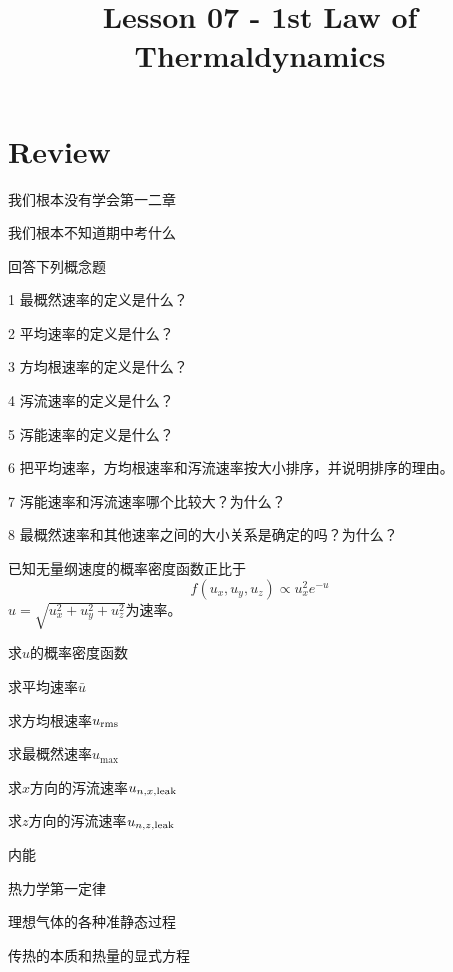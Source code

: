 \documentclass[CJK]{beamer}
\title{Lesson 07 - 1st Law of Thermaldynamics}
\author{}
\date{}
\begin{document}


\section{Review}

\begin{frame}
\bch
\bitem
\item{我们根本没有学会第一二章}
\item{我们根本不知道期中考什么}
\eitem
\ech
\end{frame}

\begin{frame}
\bch
回答下列概念题
\bitem
\item[1]{最概然速率的定义是什么？}
\item[2]{平均速率的定义是什么？}
\item[3]{方均根速率的定义是什么？}
\item[4]{泻流速率的定义是什么？}
\item[5]{泻能速率的定义是什么？}
\item[6]{把平均速率，方均根速率和泻流速率按大小排序，并说明排序的理由。}
\item[7]{泻能速率和泻流速率哪个比较大？为什么？}
\item[8]{最概然速率和其他速率之间的大小关系是确定的吗？为什么？}
\eitem

\ech
\end{frame}

\begin{frame}
\bch
{ 已知无量纲速度的概率密度函数正比于
$$f(u_x,u_y,u_z) \propto u_x^2 e^{-u}$$
$u = \sqrt{u_x^2+u_y^2+u_z^2}$为速率。
\bitem
\item{求$u$的概率密度函数}
\item{求平均速率$\bar{u}$}
\item{求方均根速率$u_{\rm rms}$}
\item{求最概然速率$u_{\max}$}
\item{求$x$方向的泻流速率$u_{n, x, \rm leak}$}
\item{求$z$方向的泻流速率$u_{n, z, \rm leak}$}
\eitem
}
\ech
\end{frame}


\begin{frame}
\bch
\bitem
\item{内能}
\item{热力学第一定律}
\item{理想气体的各种准静态过程}
\item{传热的本质和热量的显式方程}
\eitem
\ech
\end{frame}
\end{document}
